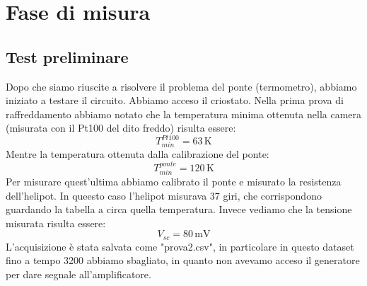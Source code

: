 \documentclass[../main/main.tex]{subfiles}
\begin{document}
\chapter{Fase di misura}

\section{Test preliminare}


Dopo che siamo riuscite a risolvere il problema del ponte (termometro), abbiamo iniziato a testare il circuito. Abbiamo acceso il criostato. Nella prima prova di raffreddamento abbiamo notato che la temperatura minima ottenuta nella camera (misurata con il Pt100 del dito freddo) risulta essere:
\begin{equation*}
  T_{min}^{Pt100} = 63 \, \text{K}
\end{equation*}
Mentre la temperatura ottenuta dalla calibrazione del ponte:
\begin{equation*}
  T_{min}^{ponte} = 120 \, \text{K}
\end{equation*}
Per misurare quest'ultima abbiamo calibrato il ponte e misurato la resistenza dell'helipot. In queesto caso l'helipot misurava 37 giri, che corrispondono guardando la tabella a circa quella temperatura.
Invece vediamo che la tensione misurata risulta essere:
\begin{equation*}
  V_{sc} = 80 \, \text{mV}
\end{equation*}
L'acquisizione è stata salvata come "prova2.csv", in particolare in questo dataset fino a tempo 3200 abbiamo sbagliato, in quanto non avevamo acceso il generatore per dare segnale all'amplificatore.
\end{document}
